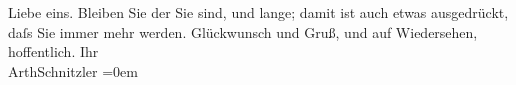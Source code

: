 \begin{ledgroupsized}[t]{13cm}
                    Liebe eins.\pend
           \pstart
           Bleiben Sie der Sie sind, und lange; damit ist auch etwas ausgedrückt, daſs Sie
                    immer mehr werden.\pend
           \pstart
           Glückwunsch und Gruß, und auf Wiedersehen, hoffentlich.\pend
           \pstart
           Ihr{\\[\baselineskip]}\spacefill\mbox{ArthSchnitzler}\pend
           \leftskip=0em{}\endnumbering{}\end{ledgroupsized}  \newcommand{\dateiname}{L02523}\newcommand{\titel}{Arthur Schnitzler an Thomas Mann, 18. 11. 1929}\newcommand{\editorInnen}{Martin Anton Müller und Gerd-Hermann Susen}
      